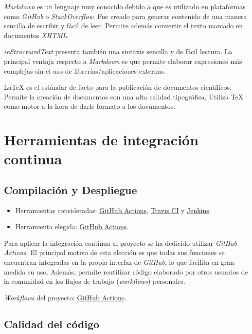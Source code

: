 \emph{Markdown} es un lenguaje muy conocido debido a que es utilizado en
plataformas como \emph{GitHub} o \emph{StackOverflow}. Fue creado para
generar contenido de una manera sencilla de escribir y fácil de leer.
Permite además convertir el texto marcado en documentos \emph{XHTML}.

\emph{reStructuredText} presenta también una sintaxis sencilla y de
fácil lectura. La principal ventaja respecto a \emph{Markdown} es que
permite elaborar expresiones más complejas sin el uso de
librerías/aplicaciones externas.

\LaTeX{} es el estándar de facto para la publicación de documentos
científicos. Permite la creación de documentos con una alta calidad
tipográfica. Utiliza \TeX{} como motor a la hora de darle formato a
los documentos.

\section{Herramientas de integración continua}

\subsection{Compilación y Despliegue}

\begin{itemize}
\tightlist
\item
  Herramientas consideradas:
  \href{https://github.com/features/actions}{GitHub Actions},
  \href{https://travis-ci.org/}{Travis CI} y
  \href{https://jenkins.io/}{Jenkins}.
\item
  Herramienta elegida: \href{https://github.com/features/actions}{GitHub
  Actions}.
\end{itemize}

Para aplicar la integración continua al proyecto se ha dedicido utilizar
\emph{GitHub Actions}. El principal motivo de esta elección es que todas
sus funciones se encuentran integradas en la propia interfaz de
\emph{GitHub}, lo que facilita en gran medida su uso. Además, permite
reutilizar código elaborado por otros usuarios de la comunidad en los
flujos de trabajo (\emph{workflows}) personales.

\emph{Workflows} del proyecto: \href{https://github.com/gcm1001/TFG-CeniehAriadne/actions}{GitHub Actions}.


\subsection{Calidad del código}

